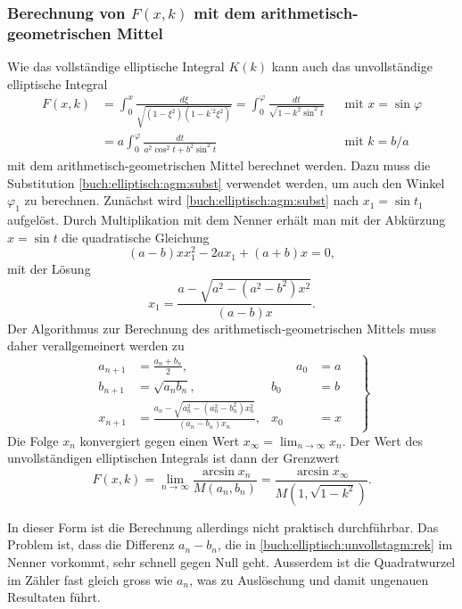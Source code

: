 %
%
\subsubsection{Berechnung von $F(x,k)$ mit dem arithmetisch-geometrischen
Mittel\label{buch:elliptisch:subsubection:berechnung-fxk-agm}}
Wie das vollständige elliptische Integral $K(k)$ kann auch das  
unvollständige elliptische Integral
\begin{align*}
F(x,k)
&=
\int_0^x \frac{d\xi}{\sqrt{(1-\xi^2)(1-k^{\prime 2}\xi^2)}}
=
\int_0^{\varphi}
\frac{dt}{\sqrt{1-k^2 \sin^2 t}}
&&\text{mit $x=\sin\varphi$}
\\
&=
a
\int_0^{\varphi} \frac{dt}{a^2 \cos^2 t + b^2 \sin^2 t}
&&\text{mit $k=b/a$}
\end{align*}
mit dem arithmetisch-geometrischen Mittel berechnet werden.
Dazu muss die Substitution
\eqref{buch:elliptisch:agm:subst}
verwendet werden, um auch den Winkel $\varphi_1$ zu berechnen.
Zunächst wird \eqref{buch:elliptisch:agm:subst} nach $x_1=\sin t_1$ 
aufgelöst.
Durch Multiplikation mit dem Nenner erhält man mit der Abkürzung
$x=\sin t$ %
die quadratische Gleichung
\[
(a-b)x x_1^2
-
2ax_1
+
(a+b)x 
=
0,
\]
mit der Lösung
\begin{equation}
x_1 
=
\frac{a-\sqrt{a^2-(a^2-b^2)x^2}}{(a-b)x}.
\label{buch:elliptisch:unvollstagm:xrek}
\end{equation}
Der Algorithmus zur Berechnung des arithmetisch-geometrischen Mittels
muss daher verallgemeinert werden zu
\begin{equation}
\left.
\begin{aligned}
a_{n+1} &= \frac{a_n+b_n}2,  &\qquad a_0 &= a
\\
b_{n+1} &= \sqrt{a_nb_n},    & b_0 &= b
\\
x_{n+1} &= \frac{a_n-\sqrt{a_n^2-(a_n^2-b_n^2)x_n^2}}{(a_n-b_n)x_n}, & x_0 &= x
\end{aligned}
\quad
\right\}
\label{buch:elliptisch:unvollstagm:rek}
\end{equation}
Die Folge $x_n$ konvergiert gegen einen Wert $x_{\infty} = \lim_{n\to\infty} x_n$.
Der Wert des unvollständigen elliptischen Integrals ist dann der Grenzwert
\[
F(x,k)
=
\lim_{n\to\infty}
\frac{\arcsin x_n}{M(a_n,b_n)}
=
\frac{\arcsin x_{\infty}}{M(1,\sqrt{1-k^2})}.
\]

In dieser Form ist die Berechnung allerdings nicht praktisch durchführbar.
Das Problem ist, dass die Differenz $a_n-b_n$, die in 
\eqref{buch:elliptisch:unvollstagm:rek}
im Nenner vorkommt, sehr schnell gegen Null geht.
Ausserdem ist die Quadratwurzel im Zähler fast gleich gross wie
$a_n$, was zu Auslöschung und damit ungenauen Resultaten führt.
\label{buch:elliptisch:agm:ellintegral-stabilitaet}

